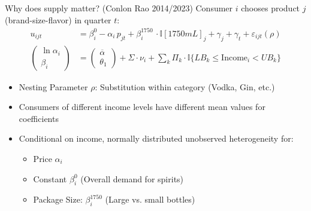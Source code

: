 \begin{frame}{Why does supply matter? (Conlon Rao 2014/2023)}
Consumer $i$ chooses product $j$ (brand-size-flavor) in quarter $t$:
\begin{align*}
u_{ijt} &= \beta_{i}^0 -  \alpha_i\, p_{jt} + \beta_i^{1750}\, \cdot \mathbb{I}[1750mL]_j + \gamma_j + \gamma_t+ \varepsilon_{ijt}(\rho)\\
\begin{pmatrix}
\ln \alpha_i\\
\beta_i
\end{pmatrix} &=
\begin{pmatrix}
\overline{\alpha}\\
\theta_1
\end{pmatrix} + \Sigma \cdot \nu_i + \sum_{k} \Pi_k \cdot \mathbb{I}\{LB_k \leq \text{Income}_i < UB_k\} 
\end{align*}
\begin{itemize}
\item Nesting Parameter $\rho$: Substitution within category (Vodka, Gin, etc.) %
\item Consumers of different income levels have different mean values for coefficients
\item Conditional on income, normally distributed unobserved heterogeneity for:
\begin{itemize}
\item Price $\alpha_i$
\item Constant $\beta_{i}^0$ (Overall demand for spirits)
\item Package Size: $\beta_{i}^{1750}$ (Large vs. small bottles)
\end{itemize}
\end{itemize}
\end{frame}


